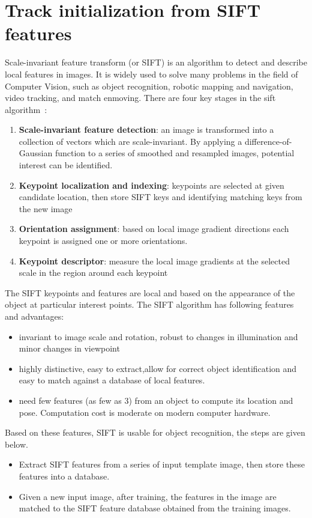 \section{Track initialization from SIFT features}
\label{sift_init}
Scale-invariant feature transform (or SIFT) is an algorithm to detect
and describe local features in images.  It is widely used to solve
many problems in the field of Computer Vision, such as object
recognition, robotic mapping and navigation, video tracking, and match
enmoving. There are four key stages in the sift algorithm~\cite{lowe2004distinctive}:
\begin{enumerate}
\item \textbf{Scale-invariant feature detection}: an image is transformed into
  a collection of vectors which are scale-invariant. By applying a difference-of-Gaussian
function to a series of smoothed and resampled images, potential
interest can be identified.
\item \textbf{Keypoint localization and indexing}: keypoints are selected at given
  candidate location, then store SIFT keys and identifying matching keys from the new image
\item \textbf{Orientation assignment}:  based on local image gradient
  directions each keypoint is assigned one or more orientations.
\item \textbf{Keypoint descriptor}: measure the local image gradients
  at the selected scale in the region around each keypoint
\end{enumerate}


The SIFT keypoints and features are local and based on the appearance
of the object at particular interest points. The SIFT algorithm has following
features and advantages:
\begin{itemize}
\item invariant to image scale and rotation, robust to changes in
  illumination and minor changes in viewpoint
\item highly distinctive, easy to extract,allow for correct object
  identification and easy to match against a database of local
  features. 
\item need few features (as few as 3) from an object to compute its location
  and pose. Computation cost is moderate on modern computer hardware.
\end{itemize}

Based on these features, SIFT is usable for object recognition, the
steps are given below.
\begin{itemize}
\item Extract SIFT features from a series of input template image,
  then store these features into a database.
\item Given a new input image, after training, the features in
  the image are matched to the SIFT feature database obtained from the
  training images.
\end{itemize}

